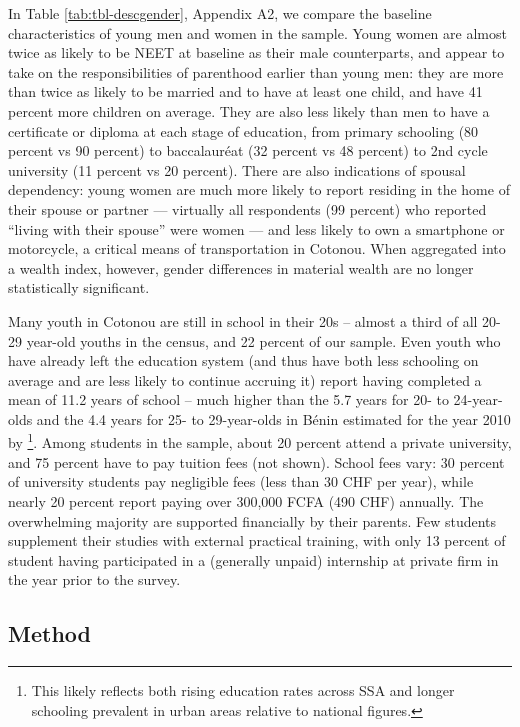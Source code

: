 \documentclass[
  a4paper, twoside, 12pt]{book}
\begin{document}
In Table \ref{tab:tbl-descgender}, Appendix A2, we compare the baseline characteristics of young men and women in the sample. Young women are almost twice as likely to be NEET at baseline as their male counterparts, and appear to take on the responsibilities of parenthood earlier than young men: they are more than twice as likely to be married and to have at least one child, and have 41 percent more children on average. They are also less likely than men to have a certificate or diploma at each stage of education, from primary schooling (80 percent vs 90 percent) to baccalauréat (32 percent vs 48 percent) to 2nd cycle university (11 percent vs 20 percent). There are also indications of spousal dependency: young women are much more likely to report residing in the home of their spouse or partner --- virtually all respondents (99 percent) who reported ``living with their spouse'' were women --- and less likely to own a smartphone or motorcycle, a critical means of transportation in Cotonou. When aggregated into a wealth index, however, gender differences in material wealth are no longer statistically significant.

Many youth in Cotonou are still in school in their 20s -- almost a third of all 20-29 year-old youths in the census, and 22 percent of our sample. Even youth who have already left the education system (and thus have both less schooling on average and are less likely to continue accruing it) report having completed a mean of 11.2 years of school -- much higher than the 5.7 years for 20- to 24-year-olds and the 4.4 years for 25- to 29-year-olds in Bénin estimated for the year 2010 by \textcite{barro2013}\footnote{This likely reflects both rising education rates across SSA and longer schooling prevalent in urban areas relative to national figures.}. Among students in the sample, about 20 percent attend a private university, and 75 percent have to pay tuition fees (not shown). School fees vary: 30 percent of university students pay negligible fees (less than 30 CHF per year), while nearly 20 percent report paying over 300,000 FCFA (490 CHF) annually. The overwhelming majority are supported financially by their parents. Few students supplement their studies with external practical training, with only 13 percent of student having participated in a (generally unpaid) internship at private firm in the year prior to the survey.

\hypertarget{survey-method}{%
\subsection*{Method}\label{survey-method}}
\end{document}
